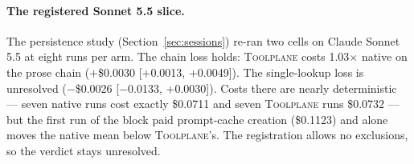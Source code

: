 \documentclass[10pt,twocolumn]{article}
\newcommand{\toolplane}{\textsc{Toolplane}\xspace}
\newcommand{\usd}[1]{\$#1}
\begin{document}
\paragraph{The registered Sonnet 5.5 slice.}  The persistence study
(Section~\ref{sec:sessions}) re-ran two cells on Claude Sonnet 5.5 at eight
runs per arm.  The chain loss holds: \toolplane costs 1.03$\times$ native on
the prose chain ($+$\usd{0.0030} [$+$0.0013, $+$0.0049]).  The single-lookup
loss is unresolved ($-$\usd{0.0026} [$-$0.0133, $+$0.0030]).  Costs there are
nearly deterministic --- seven native runs cost exactly \usd{0.0711} and seven
\toolplane runs \usd{0.0732} --- but the first run of the block paid prompt-cache
creation (\usd{0.1123}) and alone moves the native mean below \toolplane's.
The registration allows no exclusions, so the verdict stays unresolved.

\begin{table}[t]
\centering
\scriptsize
\caption{Where the cost goes: median token classes per run, Claude Haiku 5.5,
native / \toolplane.  Uncached input includes cache writes; peak is the
largest single-request context.}
\label{tab:tokens}
\end{table}
\end{document}
